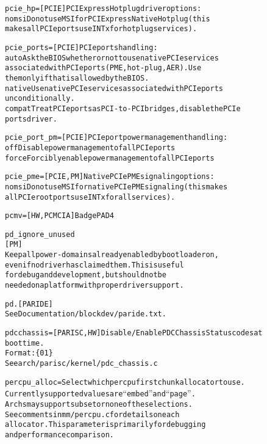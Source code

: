 \documentclass[a4paper,8pt,english]{sphinxmanual}
\begin{document}
\begin{alltt}
        pcie\_hp=        {[}PCIE{]} PCI Express Hotplug driver options:
                nomsi   Do not use MSI for PCI Express Native Hotplug (this
                        makes all PCIe ports use INTx for hotplug services).

        pcie\_ports=     {[}PCIE{]} PCIe ports handling:
                auto    Ask the BIOS whether or not to use native PCIe services
                        associated with PCIe ports (PME, hot-plug, AER).  Use
                        them only if that is allowed by the BIOS.
                native  Use native PCIe services associated with PCIe ports
                        unconditionally.
                compat  Treat PCIe ports as PCI-to-PCI bridges, disable the PCIe
                        ports driver.

        pcie\_port\_pm=   {[}PCIE{]} PCIe port power management handling:
                off     Disable power management of all PCIe ports
                force   Forcibly enable power management of all PCIe ports

        pcie\_pme=       {[}PCIE,PM{]} Native PCIe PME signaling options:
                nomsi   Do not use MSI for native PCIe PME signaling (this makes
                        all PCIe root ports use INTx for all services).

        pcmv=           {[}HW,PCMCIA{]} BadgePAD 4

        pd\_ignore\_unused
                        {[}PM{]}
                        Keep all power-domains already enabled by bootloader on,
                        even if no driver has claimed them. This is useful
                        for debug and development, but should not be
                        needed on a platform with proper driver support.

        pd.             {[}PARIDE{]}
                        See Documentation/blockdev/paride.txt.

        pdcchassis=     {[}PARISC,HW{]} Disable/Enable PDC Chassis Status codes at
                        boot time.
                        Format: \{ 0 \textbar{} 1 \}
                        See arch/parisc/kernel/pdc\_chassis.c

        percpu\_alloc=   Select which percpu first chunk allocator to use.
                        Currently supported values are ``embed'' and ``page''.
                        Archs may support subset or none of the selections.
                        See comments in mm/percpu.c for details on each
                        allocator.  This parameter is primarily for debugging
                        and performance comparison.


\end{alltt}
\end{document}
